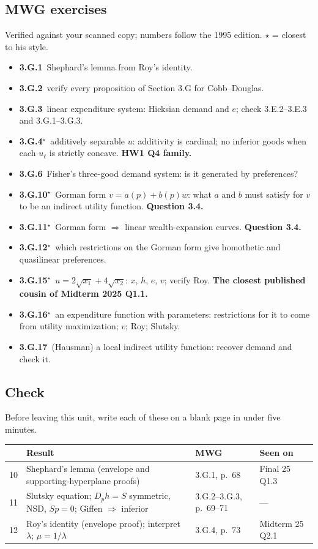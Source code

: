 \documentclass[11pt]{article}
\begin{document}
\subsection{MWG exercises}
\begin{todo}{Verified against your scanned copy; numbers follow the 1995 edition. $\star$ = closest to his style.}
\begin{itemize}
\item \textbf{3.G.1}\ Shephard's lemma from Roy's identity.
\item \textbf{3.G.2}\ verify every proposition of Section 3.G for Cobb--Douglas.
\item \textbf{3.G.3}\ linear expenditure system: Hicksian demand and $e$; check 3.E.2--3.E.3 and 3.G.1--3.G.3.
\item \textbf{3.G.4}$^\star$\ additively separable $u$: additivity is cardinal; no inferior goods when each $u_\ell$ is strictly concave. \textbf{HW1 Q4 family.}
\item \textbf{3.G.6}\ Fisher's three-good demand system: is it generated by preferences?
\item \textbf{3.G.10}$^\star$\ Gorman form $v=a(p)+b(p)w$: what $a$ and $b$ must satisfy for $v$ to be an indirect utility function. \textbf{Question 3.4.}
\item \textbf{3.G.11}$^\star$\ Gorman form $\Rightarrow$ linear wealth-expansion curves. \textbf{Question 3.4.}
\item \textbf{3.G.12}$^\star$\ which restrictions on the Gorman form give homothetic and quasilinear preferences.
\item \textbf{3.G.15}$^\star$\ $u=2\sqrt{x_1}+4\sqrt{x_2}$: $x$, $h$, $e$, $v$; verify Roy. \textbf{The closest published cousin of Midterm 2025 Q1.1.}
\item \textbf{3.G.16}$^\star$\ an expenditure function with parameters: restrictions for it to come from utility maximization; $v$; Roy; Slutsky.
\item \textbf{3.G.17}\ (Hausman) a local indirect utility function: recover demand and check it.
\end{itemize}
\end{todo}
\subsection{Check}
Before leaving this unit, write each of these on a blank page in under five minutes.
\begin{center}\small\begin{tabular}{rp{7.4cm}p{3.3cm}p{3.1cm}}\toprule & Result & MWG & Seen on\\\midrule
10 & Shephard's lemma (envelope and supporting-hyperplane proofs) & 3.G.1, p.~68 & Final 25 Q1.3\\
11 & Slutsky equation; $D_ph=S$ symmetric, NSD, $Sp=0$; Giffen $\Rightarrow$ inferior & 3.G.2--3.G.3, p.~69--71 & ---\\
12 & Roy's identity (envelope proof); interpret $\lambda$; $\mu=1/\lambda$ & 3.G.4, p.~73 & Midterm 25 Q2.1\\
\bottomrule\end{tabular}\end{center}
\end{document}
